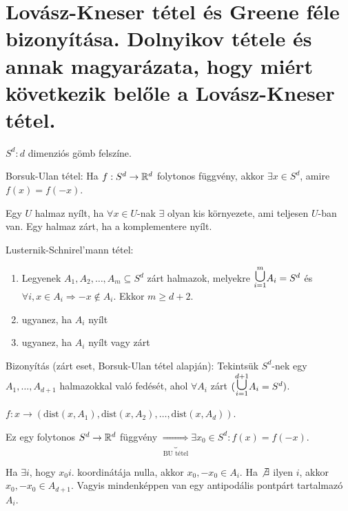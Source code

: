 \chapter{Lovász-Kneser tétel és Greene féle bizonyítása. Dolnyikov tétele és annak magyarázata, hogy miért következik belőle a Lovász-Kneser tétel.}

\begin{notation}
  $S^d: d$ dimenziós gömb felszíne.
\end{notation}

\begin{thm} Borsuk-Ulan tétel:
  Ha $f: S^d \rightarrow \mathbb{R}^d$ folytonos függvény, akkor $\exists x \in S^d$, amire $f(x) = f(-x)$.
\end{thm}

\begin{dfn}
  Egy $U$ halmaz nyílt, ha $\forall x \in U$-nak $\exists$ olyan kis környezete, ami teljesen $U$-ban van. Egy halmaz zárt, ha a komplementere nyílt.
\end{dfn}

\begin{thm} Lusternik-Schnirel'mann tétel:
  \begin{enumerate}
    \item Legyenek $A_1, A_2, \dots, A_m \subseteq S^d$ zárt halmazok, melyekre
    $\overset{m}{\underset{i=1}{\text{\LARGE $\cup$}}} A_i = S^d$ és $\forall i, x \in A_i \Rightarrow -x \not \in A_i$. Ekkor $m \geq d + 2$.
    \item ugyanez, ha $A_i$ nyílt
    \item ugyanez, ha $A_i$ nyílt vagy zárt
  \end{enumerate}
\end{thm}

Bizonyítás (zárt eset, Borsuk-Ulan tétel alapján):
Tekintsük $S^d$-nek egy $A_1, \dots, A_{d+1}$ halmazokkal való fedését, ahol $\forall A_i$ zárt $(\overset{d+1}{\underset{i=1}{\text{\LARGE $\cup$}}} A_i = S^d)$.

$f: x \rightarrow (\text{dist}(x, A_1), \text{dist}(x, A_2), \dots, \text{dist}(x, A_d))$.

Ez egy folytonos $S^d \rightarrow \mathbb{R}^d$ függvény $\underbrace{\Rightarrow}_{\text{BU tétel}} \exists x_0 \in S^d: f(x) = f(-x)$.

Ha $\exists i$, hogy $x_0 i.$ koordinátája nulla, akkor $x_0, -x_0 \in A_i$. Ha $\not \exists$ ilyen $i$, akkor $x_0, -x_0 \in A_{d+1}$. Vagyis mindenképpen van egy antipodális pontpárt tartalmazó $A_i$.
\QED

